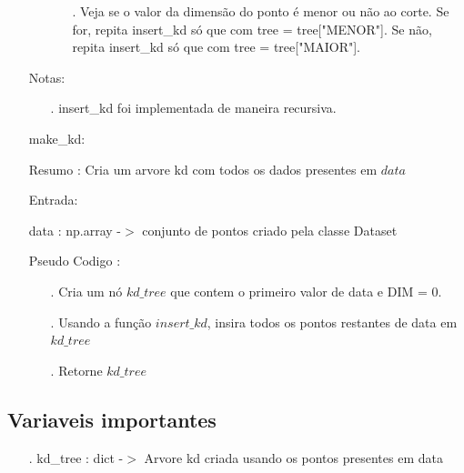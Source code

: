 \documentclass{article}
\begin{document}
\begin{enumerate}
\begin{enumerate}
			\begin{enumerate}
			\item[.] Veja se o valor da dimensão do ponto é menor ou não ao corte. Se for, repita insert\_kd só que com tree = tree["MENOR"]. Se não,  repita insert\_kd só que com tree = tree["MAIOR"].
			\end{enumerate}
	
		\end{enumerate}
		
		\quad Notas:

		\begin{enumerate}
	
		\item[.] insert\_kd foi implementada de maneira recursiva.

		\end{enumerate}

	\item[] make\_kd: 
	
		\quad Resumo : Cria um arvore kd com todos os dados presentes em $data$

		\quad Entrada: 
	
			\qquad data : np.array -$>$ conjunto de pontos criado pela classe Dataset
	
		\quad Pseudo Codigo :
		
		\begin{enumerate}
	
		\item[.] Cria um nó $kd\_tree$ que contem o primeiro valor de data e DIM = 0.

		\item[.] Usando a função $insert\_kd$, insira todos os pontos restantes de data em $kd\_tree$

		\item[.] Retorne $kd\_tree$
		\end{enumerate}	

\end{enumerate}

\subsection{Variaveis importantes}

\begin{enumerate}

\item[.] kd\_tree : dict -$>$ Arvore kd criada usando os pontos presentes em data

\end{enumerate}
\end{document}
